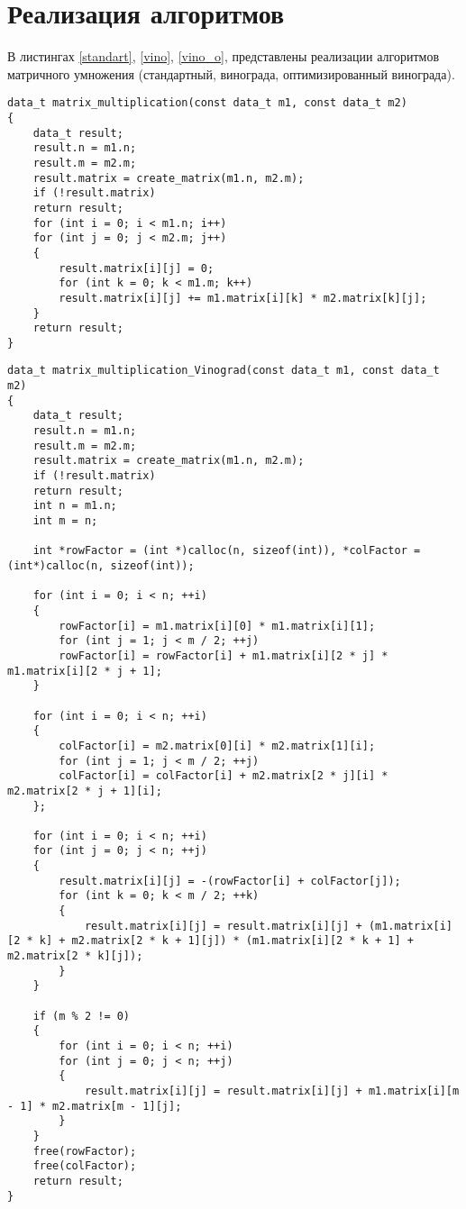 \section{Реализация алгоритмов}
В листингах \ref{standart}, \ref{vino}, \ref{vino_o}, представлены реализации алгоритмов матричного умножения (стандартный, винограда, оптимизированный винограда). 
\begin{center}
\begin{lstlisting}[label=standart, caption={Стандартный алгоритм умножения матриц}]
data_t matrix_multiplication(const data_t m1, const data_t m2)
{
	data_t result;
	result.n = m1.n;
	result.m = m2.m;
	result.matrix = create_matrix(m1.n, m2.m);
	if (!result.matrix)
	return result;
	for (int i = 0; i < m1.n; i++)
	for (int j = 0; j < m2.m; j++)
	{
		result.matrix[i][j] = 0;
		for (int k = 0; k < m1.m; k++)
		result.matrix[i][j] += m1.matrix[i][k] * m2.matrix[k][j];
	}
	return result;
}
\end{lstlisting}
\end{center}
\newpage
\begin{center}
\begin{lstlisting}[label=vino, caption={Алгоритм Винограда умножения матриц}]
data_t matrix_multiplication_Vinograd(const data_t m1, const data_t m2)
{
	data_t result;
	result.n = m1.n;
	result.m = m2.m;
	result.matrix = create_matrix(m1.n, m2.m);
	if (!result.matrix)
	return result;
	int n = m1.n;
	int m = n;
	
	int *rowFactor = (int *)calloc(n, sizeof(int)), *colFactor = (int*)calloc(n, sizeof(int));
	
	for (int i = 0; i < n; ++i)
	{
		rowFactor[i] = m1.matrix[i][0] * m1.matrix[i][1];
		for (int j = 1; j < m / 2; ++j)
		rowFactor[i] = rowFactor[i] + m1.matrix[i][2 * j] * m1.matrix[i][2 * j + 1];
	}
	
	for (int i = 0; i < n; ++i)
	{
		colFactor[i] = m2.matrix[0][i] * m2.matrix[1][i];
		for (int j = 1; j < m / 2; ++j)
		colFactor[i] = colFactor[i] + m2.matrix[2 * j][i] * m2.matrix[2 * j + 1][i];
	};
	
	for (int i = 0; i < n; ++i)
	for (int j = 0; j < n; ++j)
	{
		result.matrix[i][j] = -(rowFactor[i] + colFactor[j]);
		for (int k = 0; k < m / 2; ++k)
		{
			result.matrix[i][j] = result.matrix[i][j] + (m1.matrix[i][2 * k] + m2.matrix[2 * k + 1][j]) * (m1.matrix[i][2 * k + 1] + m2.matrix[2 * k][j]);
		}
	}
	
	if (m % 2 != 0)
	{
		for (int i = 0; i < n; ++i)
		for (int j = 0; j < n; ++j)
		{
			result.matrix[i][j] = result.matrix[i][j] + m1.matrix[i][m - 1] * m2.matrix[m - 1][j];
		}
	}
	free(rowFactor);
	free(colFactor);
	return result;
}
\end{lstlisting}
\end{center}
